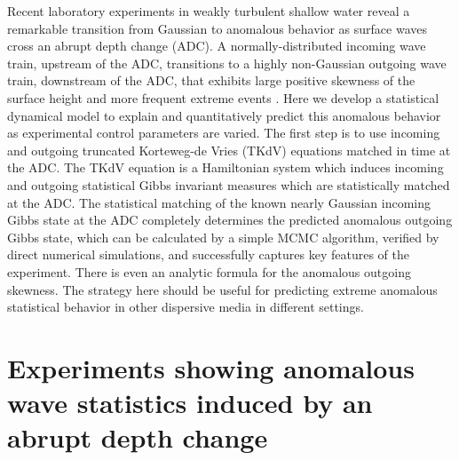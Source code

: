 \documentclass[9pt,twocolumn,twoside,lineno]{pnas-new}
\begin{document}
Recent laboratory experiments in weakly turbulent shallow water reveal a remarkable transition from Gaussian to anomalous behavior as surface waves cross an abrupt depth change (ADC). 
A normally-distributed incoming wave train, upstream of the ADC, transitions to a highly non-Gaussian outgoing wave train, downstream of the ADC, that exhibits large positive skewness of the surface height and more frequent extreme events \cite{bolles2018anomalous}.
Here we develop a statistical dynamical model to explain and quantitatively
predict this anomalous behavior as experimental control
parameters are varied. The first step is to use incoming and outgoing
truncated Korteweg-de Vries (TKdV) equations matched in time at the
ADC. The TKdV equation is a Hamiltonian system which induces incoming
and outgoing statistical Gibbs invariant measures which are statistically
matched at the ADC. The statistical matching of the known nearly Gaussian
incoming Gibbs state at the ADC completely determines the predicted
anomalous outgoing Gibbs state, which can be calculated by a simple
MCMC algorithm, verified by direct numerical simulations, and successfully
captures key features of the experiment. There is even an analytic
formula for the anomalous outgoing skewness. The strategy here should
be useful for predicting extreme anomalous statistical behavior in
other dispersive media in different settings.


\section{Experiments showing anomalous wave statistics induced by an abrupt depth change}

\end{document}

